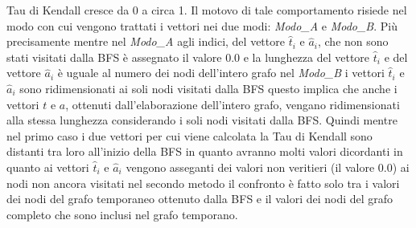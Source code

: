 Tau di Kendall cresce da 0 a circa 1. Il motovo di tale comportamento risiede nel modo con cui vengono trattati i vettori nei due modi: \textit{Modo\_A} e \textit{Modo\_B}. Più precisamente mentre nel \textit{Modo\_A} agli indici, del vettore \(\hat{t}_i\) e \(\hat{a}_i\), che non sono stati visitati dalla BFS è assegnato il valore 0.0 e la lunghezza del vettore \(\hat{t}_i\) e del vettore \(\hat{a}_i\) è uguale al numero dei nodi dell'intero grafo nel \textit{Modo\_B} i vettori \(\hat{t}_i\) e \(\hat{a}_i\) sono ridimensionati ai soli nodi visitati dalla BFS questo implica che anche i vettori \(t\) e \(a\), ottenuti dall'elaborazione dell'intero grafo, vengano ridimensionati alla stessa lunghezza considerando i soli nodi visitati dalla BFS. Quindi mentre nel primo caso i due vettori per cui viene calcolata la Tau di Kendall sono distanti tra loro all'inizio della BFS in quanto avranno molti valori dicordanti in quanto ai vettori \(\hat{t}_i\) e \(\hat{a}_i\) vengono asseganti dei valori non veritieri (il 
valore 0.0) ai nodi non ancora visitati nel secondo metodo il confronto è fatto solo tra i valori dei nodi del grafo temporaneo ottenuto dalla BFS e il valori dei nodi del grafo completo che sono inclusi nel grafo temporano. 
